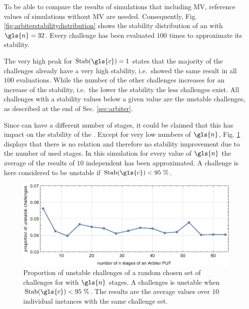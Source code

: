 To be able to compare the results of simulations that including \ac{MV}, reference values of \apufs simulations without \ac{MV} are needed.
Consequently, Fig. \ref{fig:arbiterstabilitydistribution} shows the stability distribution of an \apuf with $\gls{n} = 32$.
Every challenge has been evaluated $100$ times to approximate its stability.

The very high peak for $\Stab(\gls{c}) = 1$ states that the majority of the challenges already have a very high stability, i.e.\ showed the same result in all $100$ evaluations.
While the number of the other challenges increases for an increase of the stability, i.e.\ the lower the stability the less challenges exist.
All challenges with a stability values below a given value are the unstable challenges, as described at the end of Sec. \ref{sec:arbiter}.

Since \apufs can have a different number of stages, it could be claimed that this has impact on the stability of the \puf.
Except for very low numbers of $\gls{n}$, Fig. \ref{fig:arbiterstabilities} displays that there is no relation and therefore no stability improvement due to the number of used stages. %
In this simulation for every value of $\gls{n}$ the average of the results of $10$ independent \apufs has been approximated.
A challenge is here considered to be unstable if $\Stab(\gls{c}) < 95\ \%$.

\begin{figure}[ht]
\includegraphics[width=1.00\textwidth]{images/stages-stab-simulation.eps}
\caption[Proportion of unstable challenges of an \apuf]{Proportion of unstable challenges of a random chosen set of challenges for \apufs with $\gls{n}$ stages. 
A challenges is unstable when $\Stab(\gls{c}) < 95\ \%$. 
The results are the average values over $10$ individual \puf instances with the same challenge set.} 
\label{fig:arbiterstabilities}
\end{figure}

